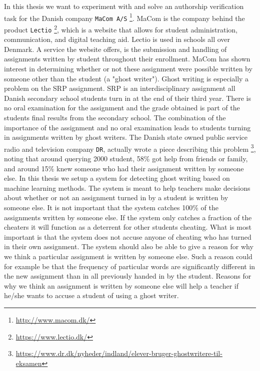 
In this thesis we want to experiment with and solve an authorship
verification task for the Danish company \texttt{MaCom A/S}
\footnote{\url{http://www.macom.dk/}}. MaCom is the company behind the product
\texttt{Lectio} \footnote{\url{https://www.lectio.dk/}}, which is a website
that allows for student administration, communication, and digital teaching
aid. Lectio is used in schools all over Denmark. A service the website offers,
is the submission and handling of assignments written by student throughout
their enrollment. MaCom has shown interest in determining whether or not these
assignment were possible written by someone other than the student (a "ghost
writer"). Ghost writing is especially a problem on the \gls{SRP} assignment.
\gls{SRP} is an interdisciplinary assignment all Danish secondary school
students turn in at the end of their third year. There is no oral examination
for the assignment and the grade obtained is part of the students final
results from the secondary school. The combination of the importance of the
assignment and no oral examination leads to students turning in assignments
written by ghost writers. The Danish state owned public service radio and
television company \texttt{DR}, actually wrote a piece describing this problem
\footnote{\url{https://www.dr.dk/nyheder/indland/elever-bruger-ghostwritere-til-
eksamen}}, noting that around querying 2000 student, 58\% got help from friends
or family, and around 15\% knew someone who had their assignment written by
someone else. In this thesis we setup a system for detecting ghost writing based
on machine learning methods. The system is meant to help teachers make decisions
about whether or not an assignment turned in by a student is written by someone
else. It is not important that the system catches 100\% of the assignments
written by someone else. If the system only catches a fraction of the cheaters
it will function as a deterrent for other students cheating. What is most
important is that the system does not accuse anyone of cheating who has turned
in their own assignment. The system should also be able to give a reason for
why we think a particular assignment is written by someone else. Such a reason
could for example be that the frequency of particular words are significantly
different in the new assignment than in all previously handed in by the student.
Reasons for why we think an assignment is written by someone else will help a
teacher if he/she wants to accuse a student of using a ghost writer.


